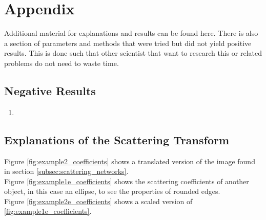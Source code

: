 \chapter{Appendix}
\label{chap:appendix}

Additional material for explanations and results can be found here. There is also a section of parameters and methods that were tried but did not yield positive results. This is done such that other scientist that want to research this or related problems do not need to waste time. 

\section{Negative Results}
\label{sec:stuff_that_did_not_work}

\begin{enumerate}
	\item 
\end{enumerate}

\section{Explanations of the Scattering Transform}

Figure \ref{fig:example2_coefficients} shows a translated version of the image found in section \ref{subsec:scattering_networks}. \\
Figure \ref{fig:example1e_coefficients} shows the scattering coefficients of another object, in this case an ellipse, to see the properties of rounded edges. \\
Figure \ref{fig:example2e_coefficients} shows a scaled version of \ref{fig:example1e_coefficients}. 

